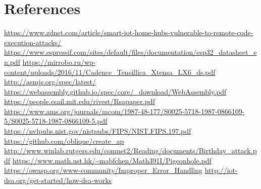 \documentclass{article}
\begin{document}
\section{References}
\begin{thebibliography}{9}
  \url{https://www.zdnet.com/article/smart-iot-home-hubs-vulnerable-to-remote-code-execution-attacks/}
	\url{https://www.espressif.com/sites/default/files/documentation/esp32_datasheet_en.pdf}
	\url{https://mirrobo.ru/wp-content/uploads/2016/11/Cadence_Tensillica_Xtensa_LX6_ds.pdf}
	\url{http://asmjs.org/spec/latest/}
	\url{https://webassembly.github.io/spec/core/_download/WebAssembly.pdf}
	\url{https://people.csail.mit.edu/rivest/Rsapaper.pdf}
	\url{https://www.ams.org/journals/mcom/1987-48-177/S0025-5718-1987-0866109-5/S0025-5718-1987-0866109-5.pdf}
	\url{https://nvlpubs.nist.gov/nistpubs/FIPS/NIST.FIPS.197.pdf}
	\url{https://github.com/oblique/create_ap}
	\url{http://www.winlab.rutgers.edu/comnet2/Reading/documents/Birthday_attack.pdf}
	\url{https://www.math.ust.hk/~mabfchen/Math391I/Pigeonhole.pdf}
  \url{https://owasp.org/www-community/Improper_Error_Handling}
  \url{http://iot-dsa.org/get-started/how-dsa-works}
\end{thebibliography}
\end{document}
